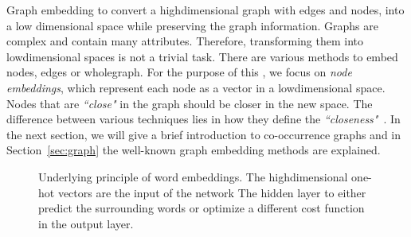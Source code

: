 \noindent
Graph embedding  to convert a high\added{-}dimensional graph with edges and nodes, into a low dimensional space while preserving the graph information.
Graphs are complex and contain many attributes. Therefore, transforming them into low\added{-}dimensional spaces is not a trivial task. There are various methods to embed nodes, edges or whole\deleted{-}graph. For the purpose of this , we focus on \emph{node embeddings}, which represent each node as a vector in a low\added{-}dimensional space. Nodes that are \emph{``close"} in the graph should be closer in the new space.
The difference between various techniques lies in how they define the  \emph{``closeness"}~. In the next section, we will give a brief introduction to co-occurrence graphs and in Section~\ref{sec:graph} the well-known graph embedding methods are explained.  
\begin{figure}
\centering 
\resizebox{0.8\textwidth}{0.48\textwidth}{      

}
\caption{Underlying principle of word embeddings. The high\added{-}dimensional one-hot vectors are the input of the network  The hidden layer  to either predict the surrounding words or  optimize a different cost function in the output layer.}
\label{fig:emb}
\end{figure}

